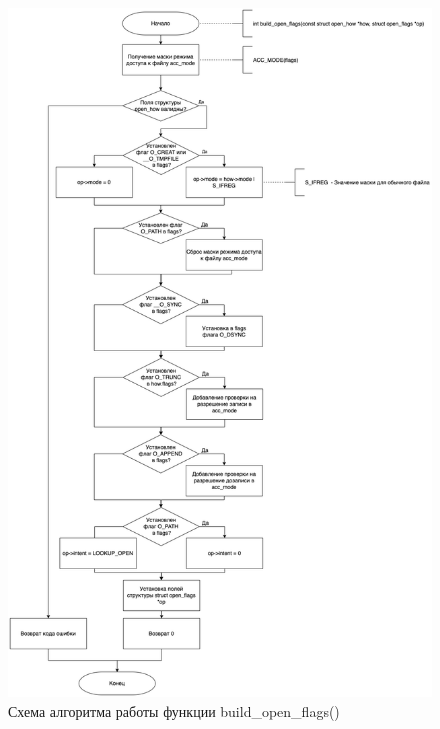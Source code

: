 \begin{figure}[h!]
	\begin{center}
		\includegraphics[width=140mm]{images/build_open_flags}
	\end{center}
	\caption{Схема алгоритма работы функции build\_open\_flags() }
	\label{img:build_open}
\end{figure}


